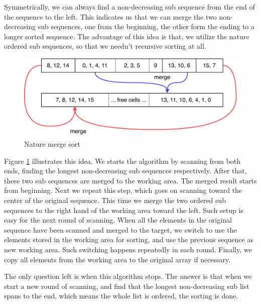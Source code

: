 \documentclass[b5paper]{article}
\begin{document}
Symmetrically, we can always find a non-decreasing sub sequence from the end of the sequence
to the left. This indicates us that we can merge the two non-decreasing sub sequences, one
from the beginning, the other form the ending to a longer sorted sequence. The advantage of
this idea is that, we utilize the nature ordered sub sequences, so that we needn't recursive
sorting at all.

\begin{figure}[htbp]
 \centering
 \includegraphics[scale=0.8]{img/nature-merge-sort}
 \caption{Nature merge sort}
 \label{fig:nature-merge-sort}
\end{figure}

Figure \ref{fig:nature-merge-sort} illustrates this idea. We starts the algorithm by scanning
from both ends, finding the longest non-decreasing sub sequences respectively. After that,
these two sub sequences are merged to the working area. The merged result starts from beginning.
Next we repeat this step, which goes on scanning toward the center of the original sequence.
This time we merge the two ordered sub sequences to the right hand of the working area toward
the left. Such setup is easy for the next round of scanning. When all the elements
in the original sequence have been scanned and merged to the target, we switch to use the
elements stored in the working area for sorting, and use the previous sequence as new working area.
Such switching happens repeatedly in each round. Finally, we copy all elements from the
working area to the original array if necessary.

The only question left is when this algorithm stops. The answer is that when we start
a new round of scanning, and find that the longest non-decreasing sub list spans to the
end, which means the whole list is ordered, the sorting is done.
\end{document}
